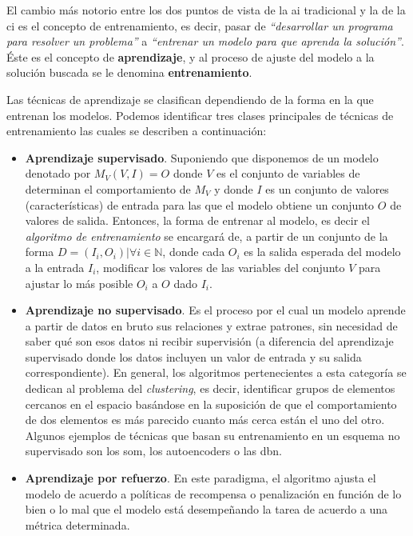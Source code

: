 El cambio más notorio entre los dos puntos de vista de la \gls{ai} tradicional y la de la \gls{ci} es el concepto de entrenamiento, es decir, pasar de \textit{\enquote{desarrollar un programa para resolver un problema}} a \textit{\enquote{entrenar un modelo para que aprenda la solución}}. Éste es el concepto de \textbf{aprendizaje}, y al proceso de ajuste del modelo a la solución buscada se le denomina \textbf{entrenamiento}.

Las técnicas de aprendizaje se clasifican dependiendo de la forma en la que entrenan los modelos. Podemos identificar tres clases principales de técnicas de entrenamiento las cuales se describen a continuación:

\begin{itemize}
	\item \textbf{Aprendizaje supervisado}. Suponiendo que disponemos de un modelo denotado por $M_V(V, I) = O$ donde $V$ es el conjunto de variables de determinan el comportamiento de $M_V$ y donde $I$ es un conjunto de valores (características) de entrada para las que el modelo obtiene un conjunto $O$ de valores de salida. Entonces, la forma de entrenar al modelo, es decir el \textit{algoritmo de entrenamiento} se encargará de, a partir de un conjunto de la forma $D = {(I_i, O_i) | \forall i \in \mathbb{N}}$, donde cada $O_i$ es la salida esperada del modelo a la entrada $I_i$, modificar los valores de las variables del conjunto $V$ para ajustar lo más posible $O_i$ a $O$ dado $I_i$.
	\item \textbf{Aprendizaje no supervisado}. Es el proceso por el cual un modelo aprende a partir de datos en bruto sus relaciones y extrae patrones, sin necesidad de saber qué son esos datos ni recibir supervisión (a diferencia del aprendizaje supervisado donde los datos incluyen un valor de entrada y su salida correspondiente). En general, los algoritmos pertenecientes a esta categoría se dedican al problema del \textit{clustering}, es decir, identificar grupos de elementos cercanos en el espacio basándose en la suposición de que el comportamiento de dos elementos es más parecido cuanto más cerca están el uno del otro. Algunos ejemplos de técnicas que basan su entrenamiento en un esquema no supervisado son los \gls{som}, los \glspl{autoencoder} o las \gls{dbn}.
	\item \textbf{Aprendizaje por refuerzo}. En este paradigma, el algoritmo ajusta el modelo de acuerdo a políticas de recompensa o penalización en función de lo bien o lo mal que el modelo está desempeñando la tarea de acuerdo a una métrica determinada. 
\end{itemize}

